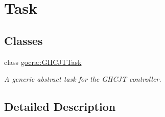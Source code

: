 \hypertarget{group__task}{}\section{Task}
\label{group__task}
\subsection*{Classes}
\begin{DoxyCompactItemize}
\item 
class \hyperlink{classgocra_1_1GHCJTTask}{gocra\+::\+G\+H\+C\+J\+T\+Task}
\begin{DoxyCompactList}\small\item\em A generic abstract task for the G\+H\+C\+JT controller. \end{DoxyCompactList}\end{DoxyCompactItemize}


\subsection{Detailed Description}
